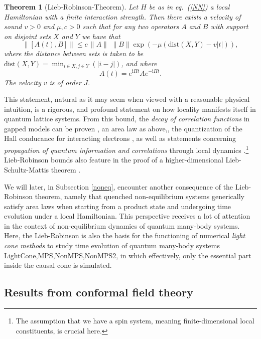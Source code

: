 \documentclass[rmp,twocolumn,floatfix,epsfig,graphics]{revtex4} %
\newcommand{\mi}{\mathrm{i} }
\newtheorem{theorem}{Theorem}
\begin{document}
\begin{theorem}[Lieb-Robinson-Theorem]
\label{LRT}
Let $H$ be  as in eq.\ (\ref{NN}) a local Hamiltonian with
a finite interaction strength. Then there exists a velocity 
of sound $v>0$ and $\mu, c>0$ such that for any two 
operators $A$ and $B$ with support on disjoint sets $X$ and 
$Y$ we have that
\begin{equation}
        \label{lrb}
        \| [A(t),B]\| \leq
        c  \, \| A \|\,\, \| B  \|
        \exp\left(-\mu ({\text{dist}}(X,Y)-v|t| )\right),
\end{equation}
where the distance between sets is taken to be
${\text{dist}}(X,Y)=\min_{i\in X,j\in Y}(|i-j|)$, 
and where 
\begin{equation*}
        A(t)=e^{ \mi H t} A e^{-\mi H t}.
\end{equation*}
The velocity $v$ is of order $J$.
\end{theorem}

This statement, natural as it may seem when viewed with 
a reasonable physical intuition, is a rigorous, and profound 
statement on how locality manifests itself in quantum 
lattice systems. From this bound, the {\it decay of 
correlation functions} in gapped models can be proven \cite{Decay,Decay2},
an area law as above,\cite{OneD}, 
the quantization of the Hall conducance for interacting electrons \cite{Michalakis},
as well as statements concerning {\it propagation of 
quantum information and correlations} through local 
dynamics \cite{Quench2}.\footnote{The assumption that
we have a spin system, meaning finite-dimensional local 
constituents, is crucial here.} Lieb-Robinson bounds 
also feature in the proof of a higher-dimensional 
Lieb-Schultz-Mattis theorem \cite{LSM2,LSM3}.

We will later, in Subsection \ref{noneq}, encounter 
another consequence 
of the Lieb-Robinson theorem, namely that quenched 
non-equilibrium systems generically satisfy area laws when
starting from a product state and undergoing time evolution under
a local Hamiltonian. This perspective receives a  lot of attention
in the context of non-equilibrium dynamics of quantum many-body
systems. Here, the Lieb-Robinson is also the basis for the functioning
of numerical  {\it light cone methods} to study time evolution of 
quantum many-body systems {LightCone,MPS,NonMPS,NonMPS2},
in which effectively, only the essential part inside the causal cone 
is simulated.

\subsection{Results from conformal field theory}
\end{document}
